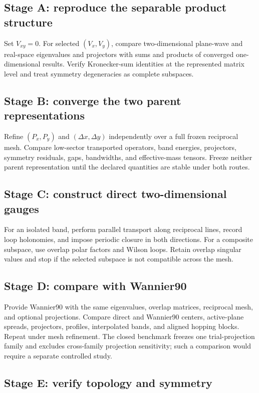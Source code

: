 \subsection{Stage A: reproduce the separable product structure}

Set $V_{xy}=0$. For selected $(V_x,V_y)$, compare two-dimensional plane-wave
and real-space eigenvalues and projectors with sums and products of converged
one-dimensional results. Verify Kronecker-sum identities at the represented
matrix level and treat symmetry degeneracies as complete subspaces.

\subsection{Stage B: converge the two parent representations}

Refine $(P_x,P_y)$ and $(\Delta x,\Delta y)$ independently over a full frozen
reciprocal mesh. Compare low-sector transported operators, band energies,
projectors, symmetry residuals, gaps, bandwidths, and effective-mass tensors.
Freeze neither parent representation until the declared quantities are stable
under both routes.

\subsection{Stage C: construct direct two-dimensional gauges}

For an isolated band, perform parallel transport along reciprocal lines, record
loop holonomies, and impose periodic closure in both directions. For a
composite subspace, use overlap polar factors and Wilson loops. Retain overlap
singular values and stop if the selected subspace is not compatible across the
mesh.

\subsection{Stage D: compare with Wannier90}

Provide Wannier90 with the same eigenvalues, overlap matrices, reciprocal mesh,
and optional projections. Compare direct and Wannier90 centers, active-plane
spreads, projectors, profiles, interpolated bands, and aligned hopping blocks.
Repeat under mesh refinement. The closed benchmark freezes one trial-projection
family and excludes cross-family projection sensitivity; such a comparison
would require a separate controlled study.

\subsection{Stage E: verify topology and symmetry}

